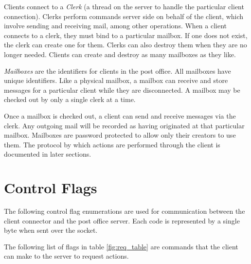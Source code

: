 \documentclass[10pt]{report}
\begin{document}
Clients connect to a \emph{Clerk} (a thread on the server to handle the particular client connection). Clerks perform commands server side on behalf of the client, which involve sending and receiving mail, among other operations. When a client connects to a clerk, they must bind to a particular mailbox. If one does not exist, the clerk can create one for them. Clerks can also destroy them when they are no longer needed. Clients can create and destroy as many mailboxes as they like.

\emph{Mailboxes} are the identifiers for clients in the post office. All mailboxes have unique identifiers. Like a physical mailbox, a mailbox can receive and store messages for a particular client while they are disconnected. A mailbox may be checked out by only a single clerk at a time.

Once a mailbox is checked out, a client can send and receive messages via the clerk. Any outgoing mail will be recorded as having originated at that particular mailbox. Mailboxes are password protected to allow only their creators to use them. The protocol by which actions are performed through the client is documented in later sections.

\section{Control Flags}

The following control flag enumerations are used for communication between the client connector and the post office server. Each code is represented by a single byte when sent over the socket.

The following list of flags in table \ref{fig:req_table} are commands that the client can make to the server to request actions.
\end{document}
